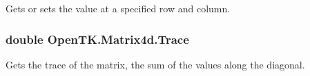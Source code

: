 Gets or sets the value at a specified row and column. 

\hypertarget{struct_open_t_k_1_1_matrix4d_ac5f5931567c5c29743f09e55d77f32ba}{
\subsubsection[{Trace}]{\setlength{\rightskip}{0pt plus 5cm}double Open\-T\-K.\-Matrix4d.\-Trace\hspace{0.3cm}{\ttfamily [get]}}}\label{struct_open_t_k_1_1_matrix4d_ac5f5931567c5c29743f09e55d77f32ba}


Gets the trace of the matrix, the sum of the values along the diagonal. 

